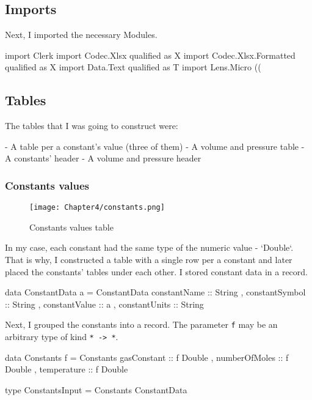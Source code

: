 



\subsection{Imports}

Next, I imported the necessary Modules.

\begin{mycode}
import Clerk
import Codec.Xlsx qualified as X
import Codec.Xlsx.Formatted qualified as X
import Data.Text qualified as T
import Lens.Micro ((%
\end{mycode}

\subsection{Tables}

The tables that I was going to construct were:

- A table per a constant's value (three of them)
- A volume and pressure table
- A constants' header
- A volume and pressure header

\subsubsection{Constants values}

\begin{figure}[h]
  \centering
  \texttt{[image: Chapter4/constants.png]}
  \caption{Constants values table}
  \label{fig:constants}
\end{figure}

In my case, each constant had the same type of the numeric value - `Double`.
That is why, I constructed a table with a single row per a constant and later placed the constants' tables under each other. I stored constant data in a record.

\begin{mycode}
data ConstantData a = ConstantData
  { constantName :: String
  , constantSymbol :: String
  , constantValue :: a
  , constantUnits :: String
  }
\end{mycode}

Next, I grouped the constants into a record. The parameter \texttt{f} may be an arbitrary type of kind \texttt{* -> *}.

\begin{mycode}
data Constants f = Constants
  { gasConstant :: f Double
  , numberOfMoles :: f Double
  , temperature :: f Double
  }

type ConstantsInput = Constants ConstantData
\end{mycode}

